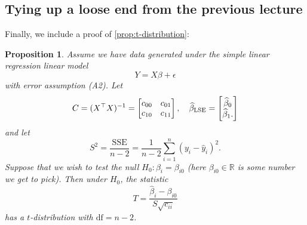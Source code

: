 \documentclass[10pt]{article}
\newtheorem{proposition}[theorem]{Proposition}
\theoremstyle{definition}
\newcommand{\1}[1]{\textbf{1}_{\left[#1\right]}} %
\def\R{\mathbb{R}} %
\begin{document}
\subsection{Tying up a loose end from the previous lecture}
Finally, we include a proof of \cref{prop:t-distribution}:

\begin{proposition}
  \label{prop:distribution-of-LSE-test-statistic}
  Assume we have data generated under the simple linear regression linear model
  \begin{equation*}
    Y=X\beta+\epsilon
  \end{equation*}
  with error assumption (A2). Let
  \begin{equation*}
    C=(X^{\top}X)^{-1}=
    \begin{bmatrix}
      c_{00}&c_{01}\\
      c_{10}&c_{11}
    \end{bmatrix},
    \quad
    \widehat{\beta}_{\rm LSE} =
    \begin{bmatrix}
      \widehat{\beta}_{0}\\  \widehat{\beta}_{1}.
    \end{bmatrix}
  \end{equation*}
  and let
  \begin{equation*}
    S^{2} = \frac{\mathrm{SSE}}{n-2} = \frac{1}{n-2} \sum_{i=1}^{n} \left( y_{i}-\widehat{y}_{i} \right)^{2}. 
  \end{equation*}
  Suppose that we wish to test the null $H_{0}: \beta_{i}=\beta_{i0}$ (here
  $\beta_{i0}\in \R$ is some number we get to pick). Then under $H_{0}$, the
  statistic
  \begin{equation*}
    T = \frac{\widehat{\beta}_{i}- \beta_{i0}}{S \sqrt{c_{ii}}}
  \end{equation*}
  has a $t$-distribution with $\mathrm{df}=n-2$.
\end{proposition}
\end{document}
